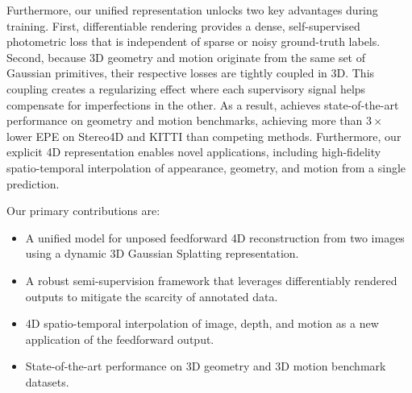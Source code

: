 Furthermore, our unified representation unlocks two key advantages during training.
First, differentiable rendering provides a dense, self-supervised photometric loss that is independent of sparse or noisy ground-truth labels.
Second, because 3D geometry and motion originate from the same set of Gaussian primitives, their respective losses are tightly coupled in 3D.
This coupling creates a regularizing effect where each supervisory signal helps compensate for imperfections in the other.
As a result, \ourmethod{} achieves state-of-the-art performance on geometry and motion benchmarks, achieving more than $3\times$ lower EPE on Stereo4D and KITTI than competing methods. 
Furthermore, our explicit 4D representation enables novel applications, including high-fidelity spatio-temporal interpolation of appearance, geometry, and motion from a single prediction.

Our primary contributions are:
\begin{itemize}
  \item A unified model for unposed feedforward 4D reconstruction from two images using a dynamic 3D Gaussian Splatting representation.
  \item A robust semi-supervision framework that leverages differentiably rendered outputs to mitigate the scarcity of annotated data.
  \item 4D spatio-temporal interpolation of image, depth, and motion as a new application of the feedforward output.
  \item State-of-the-art performance on 3D geometry and 3D motion benchmark datasets. 
\end{itemize}
